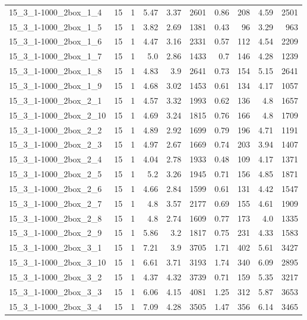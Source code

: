 \begin{center}
\begin{scriptsize}
\begin{longtable}{lrrrrrrrrr}
15\_3\_1-1000\_2box\_1\_4 & 15 & 1 & 5.47 & 3.37 & 2601 & 0.86 & 208 & 4.59 & 2501\\
15\_3\_1-1000\_2box\_1\_5 & 15 & 1 & 3.82 & 2.69 & 1381 & 0.43 & 96 & 3.29 & 963\\
15\_3\_1-1000\_2box\_1\_6 & 15 & 1 & 4.47 & 3.16 & 2331 & 0.57 & 112 & 4.54 & 2209\\
15\_3\_1-1000\_2box\_1\_7 & 15 & 1 & 5.0 & 2.86 & 1433 & 0.7 & 146 & 4.28 & 1239\\
15\_3\_1-1000\_2box\_1\_8 & 15 & 1 & 4.83 & 3.9 & 2641 & 0.73 & 154 & 5.15 & 2641\\
15\_3\_1-1000\_2box\_1\_9 & 15 & 1 & 4.68 & 3.02 & 1453 & 0.61 & 134 & 4.17 & 1057\\
15\_3\_1-1000\_2box\_2\_1 & 15 & 1 & 4.57 & 3.32 & 1993 & 0.62 & 136 & 4.8 & 1657\\
15\_3\_1-1000\_2box\_2\_10 & 15 & 1 & 4.69 & 3.24 & 1815 & 0.76 & 166 & 4.8 & 1709\\
15\_3\_1-1000\_2box\_2\_2 & 15 & 1 & 4.89 & 2.92 & 1699 & 0.79 & 196 & 4.71 & 1191\\
15\_3\_1-1000\_2box\_2\_3 & 15 & 1 & 4.97 & 2.67 & 1669 & 0.74 & 203 & 3.94 & 1407\\
15\_3\_1-1000\_2box\_2\_4 & 15 & 1 & 4.04 & 2.78 & 1933 & 0.48 & 109 & 4.17 & 1371\\
15\_3\_1-1000\_2box\_2\_5 & 15 & 1 & 5.2 & 3.26 & 1945 & 0.71 & 156 & 4.85 & 1871\\
15\_3\_1-1000\_2box\_2\_6 & 15 & 1 & 4.66 & 2.84 & 1599 & 0.61 & 131 & 4.42 & 1547\\
15\_3\_1-1000\_2box\_2\_7 & 15 & 1 & 4.8 & 3.57 & 2177 & 0.69 & 155 & 4.61 & 1909\\
15\_3\_1-1000\_2box\_2\_8 & 15 & 1 & 4.8 & 2.74 & 1609 & 0.77 & 173 & 4.0 & 1335\\
15\_3\_1-1000\_2box\_2\_9 & 15 & 1 & 5.86 & 3.2 & 1817 & 0.75 & 231 & 4.33 & 1583\\
15\_3\_1-1000\_2box\_3\_1 & 15 & 1 & 7.21 & 3.9 & 3705 & 1.71 & 402 & 5.61 & 3427\\
15\_3\_1-1000\_2box\_3\_10 & 15 & 1 & 6.61 & 3.71 & 3193 & 1.74 & 340 & 6.09 & 2895\\
15\_3\_1-1000\_2box\_3\_2 & 15 & 1 & 4.37 & 4.32 & 3739 & 0.71 & 159 & 5.35 & 3217\\
15\_3\_1-1000\_2box\_3\_3 & 15 & 1 & 6.06 & 4.15 & 4081 & 1.25 & 312 & 5.87 & 3653\\
15\_3\_1-1000\_2box\_3\_4 & 15 & 1 & 7.09 & 4.28 & 3505 & 1.47 & 356 & 6.14 & 3465\\

\end{longtable}
\end{scriptsize}
\end{center}

